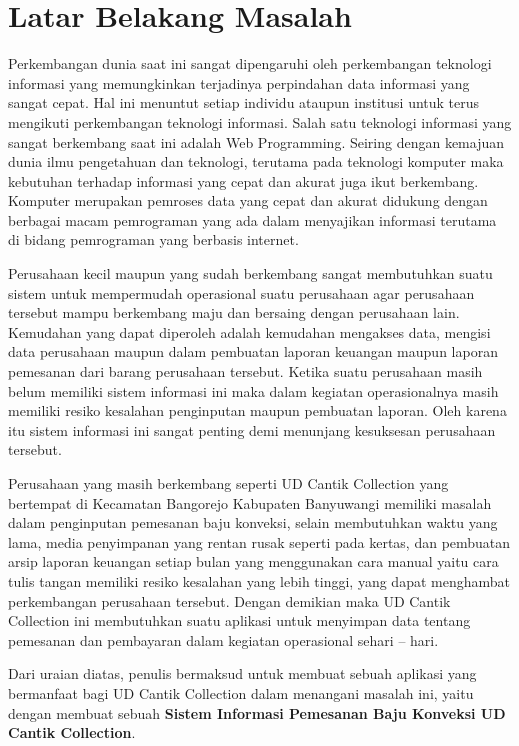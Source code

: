 \documentclass{jtetiproposalskripsi}
\begin{document}
\section{Latar Belakang Masalah}
Perkembangan dunia saat ini sangat dipengaruhi oleh perkembangan teknologi informasi yang memungkinkan terjadinya perpindahan data informasi yang sangat cepat. Hal ini menuntut setiap individu ataupun institusi untuk terus mengikuti perkembangan teknologi informasi. Salah satu teknologi informasi yang sangat berkembang saat ini adalah Web Programming. Seiring dengan kemajuan dunia ilmu pengetahuan dan teknologi, terutama pada teknologi komputer maka kebutuhan terhadap informasi yang cepat dan akurat juga ikut berkembang. Komputer merupakan pemroses data yang cepat dan akurat didukung dengan berbagai macam pemrograman yang ada dalam menyajikan informasi terutama di bidang pemrograman yang berbasis internet. 

Perusahaan kecil maupun yang sudah berkembang sangat membutuhkan suatu sistem untuk mempermudah operasional suatu perusahaan agar perusahaan tersebut mampu berkembang maju dan bersaing dengan perusahaan lain. Kemudahan yang dapat diperoleh adalah kemudahan mengakses data, mengisi data perusahaan maupun dalam pembuatan laporan keuangan maupun laporan pemesanan dari barang perusahaan tersebut. Ketika suatu perusahaan masih belum memiliki sistem informasi ini maka dalam kegiatan operasionalnya masih memiliki resiko kesalahan penginputan maupun pembuatan laporan. Oleh karena itu sistem informasi ini sangat penting demi menunjang kesuksesan perusahaan tersebut.

Perusahaan yang masih berkembang seperti UD Cantik Collection yang bertempat di Kecamatan Bangorejo Kabupaten Banyuwangi memiliki masalah dalam penginputan pemesanan baju konveksi, selain membutuhkan waktu yang lama, media penyimpanan yang rentan rusak seperti pada kertas, dan pembuatan arsip laporan keuangan setiap bulan yang menggunakan cara manual yaitu cara tulis tangan memiliki resiko kesalahan yang lebih tinggi, yang dapat menghambat perkembangan perusahaan tersebut. Dengan demikian maka UD Cantik Collection ini membutuhkan suatu aplikasi untuk menyimpan data tentang pemesanan dan pembayaran dalam kegiatan operasional sehari – hari. 

Dari uraian diatas, penulis bermaksud untuk membuat sebuah aplikasi yang bermanfaat bagi  UD Cantik Collection dalam menangani masalah ini, yaitu dengan membuat sebuah \textbf{ Sistem Informasi Pemesanan Baju Konveksi UD Cantik Collection}.
\end{document}
